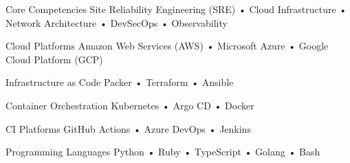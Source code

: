 

\begin{cvskills}

  \cvskill
    {Core Competencies} %
    {Site Reliability Engineering (SRE) • Cloud Infrastructure • Network Architecture • DevSecOps • Observability} %

  \cvskill
    {Cloud Platforms} %
    {Amazon Web Services (AWS) • Microsoft Azure • Google Cloud Platform (GCP)} %

  \cvskill
    {Infrastructure as Code} %
    {Packer • Terraform • Ansible} %

  \cvskill
    {Container Orchestration} %
    {Kubernetes • Argo CD • Docker} %

  \cvskill
    {CI Platforms} %
    {GitHub Actions • Azure DevOps • Jenkins} %

  \cvskill
    {Programming Languages} %
    {Python • Ruby • TypeScript • Golang • Bash} %

\end{cvskills}

